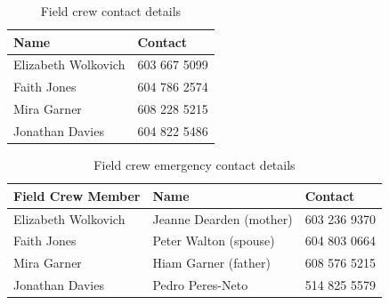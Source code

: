 \documentclass[11pt,letter]{article}
\begin{document}
\begin{table}[H]
\caption{Field crew contact details} %
\begin{tabular}{ l | l }  %
\hline\hline %
Name & Contact\\ [0.5ex] %
\hline %
Elizabeth Wolkovich & 603 667 5099\\ %
Faith Jones & 604 786 2574 \\
Mira Garner & 608 228 5215 \\
Jonathan Davies & 604 822 5486 \\ 
\hline %
\end{tabular}
\label{table:nonlin} %
\end{table}

\begin{table}[H]
\caption{Field crew emergency contact details} %
\begin{tabular}{l l l} %
\hline\hline %
Field Crew Member & Name & Contact\\ [0.5ex] %
\hline %
Elizabeth Wolkovich & Jeanne Dearden (mother) & 603 236 9370 \\ %
Faith Jones & Peter Walton (spouse) & 604 803 0664\\
Mira Garner & Hiam Garner (father) & 608 576 5215 \\
Jonathan Davies & Pedro Peres-Neto & 514 825 5579\\
\hline %
\end{tabular}
\label{table:nonlin} %
\end{table}
\end{document}
